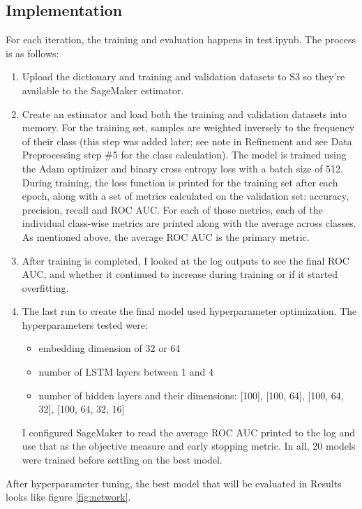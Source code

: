 \documentclass[12pt]{article}
\begin{document}
\subsection*{Implementation}
\label{sec:orgd040fb9}
For each iteration, the training and evaluation happens in test.ipynb. The process is as follows:
\begin{enumerate}
\item Upload the dictionary and training and validation datasets to S3 so they're available to the SageMaker estimator.
\item Create an estimator and load both the training and validation datasets into memory. For the training set, samples are weighted inversely to the frequency of their class (this step was added later; see note in Refinement and see Data Preprocessing step \#5 for the class calculation). The model is trained using the Adam optimizer and binary cross entropy loss with a batch size of 512. During training, the loss function is printed for the training set after each epoch, along with a set of metrics calculated on the validation set: accuracy, precision, recall and ROC AUC. For each of those metrics, each of the individual class-wise metrics are printed along with the average across classes. As mentioned above, the average ROC AUC is the primary metric.
\item After training is completed, I looked at the log outputs to see the final ROC AUC, and whether it continued to increase during training or if it started overfitting.
\item The last run to create the final model used hyperparameter optimization. The hyperparameters tested were:
\begin{itemize}
\item embedding dimension of 32 or 64
\item number of LSTM layers between 1 and 4
\item number of hidden layers and their dimensions: [100], [100, 64], [100, 64, 32], [100, 64, 32, 16]
\end{itemize}
I configured SageMaker to read the average ROC AUC printed to the log and use that as the objective measure and early stopping metric. In all, 20 models were trained before settling on the best model.
\end{enumerate}

After hyperparameter tuning, the best model that will be evaluated in Results looks like figure \ref{fig:network}.
\end{document}
